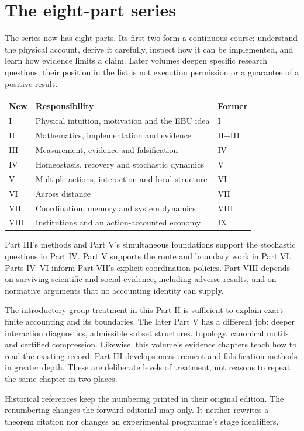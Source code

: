 \chapter*{The eight-part series}
The series now has eight parts. Its first two form a continuous course:
understand the physical account, derive it carefully, inspect how it can be
implemented, and learn how evidence limits a claim. Later volumes deepen
specific research questions; their position in the list is not execution
permission or a guarantee of a positive result.

\begin{longtable}{P{.10\linewidth}P{.66\linewidth}P{.12\linewidth}}
\toprule New & Responsibility & Former\\\midrule
I & Physical intuition, motivation and the EBU idea & I\\
II & Mathematics, implementation and evidence & II+III\\
III & Measurement, evidence and falsification & IV\\
IV & Homeostasis, recovery and stochastic dynamics & V\\
V & Multiple actions, interaction and local structure & VI\\
VI & Across distance & VII\\
VII & Coordination, memory and system dynamics & VIII\\
VIII & Institutions and an action-accounted economy & IX\\\bottomrule
\end{longtable}

Part III's methods and Part V's simultaneous foundations support the
stochastic questions in Part IV. Part V supports the route and boundary
work in Part VI. Parts IV--VI inform Part VII's explicit coordination
policies. Part VIII depends on surviving scientific and social evidence,
including adverse results, and on normative arguments that no accounting
identity can supply.

The introductory group treatment in this Part II is sufficient to explain
exact finite accounting and its boundaries. The later Part V has a different
job: deeper interaction diagnostics, admissible subset structures, topology,
canonical motifs and certified compression. Likewise, this volume's evidence
chapters teach how to read the existing record; Part III develops measurement
and falsification methods in greater depth. These are deliberate levels of
treatment, not reasons to repeat the same chapter in two places.

Historical references keep the numbering printed in their original edition.
The renumbering changes the forward editorial map only. It neither rewrites
a theorem citation nor changes an experimental programme's stage identifiers.
